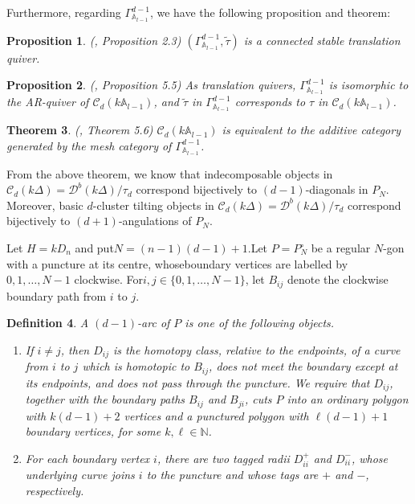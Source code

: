 \documentclass[12pt]{article}
\theoremstyle{plain}
\newtheorem{Def}{Definition}[section]
\newtheorem{Prop}[Def]{Proposition}
\newtheorem{Theo}[Def]{Theorem}
\theoremstyle{definition}
\begin{document}
Furthermore, regarding $\Gamma^{d-1}_{\mathbb{A}_{l-1}}$, we have the following proposition and theorem:

\begin{Prop}(\cite{BaurMarsh2008}, Proposition 2.3)
$(\Gamma^{d-1}_{\mathbb{A}_{l-1}}, \tilde{\tau})$ is a connected stable translation quiver.
\end{Prop}

\begin{Prop}(\cite{BaurMarsh2008}, Proposition 5.5)
As translation quivers, $\Gamma^{d-1}_{\mathbb{A}_{l-1}}$ is isomorphic to the AR-quiver of $\mathcal{C}_{d}(k\mathbb{A}_{l-1})$, and $\tilde{\tau}$ in $\Gamma^{d-1}_{\mathbb{A}_{l-1}}$ corresponds to $\tau$ in $\mathcal{C}_{d}(k\mathbb{A}_{l-1})$.
\end{Prop}

\begin{Theo}(\cite{BaurMarsh2008}, Theorem 5.6)
$\mathcal{C}_{d}(k\mathbb{A}_{l-1})$ is equivalent to the additive category generated by the mesh category of $\Gamma^{d-1}_{\mathbb{A}_{l-1}}$.
\end{Theo}

From the above theorem, we know that indecomposable objects in $\mathcal{C}_d(k\Delta) = \mathcal{D}^b(k\Delta)/\tau_{d}$ correspond bijectively to $(d-1)$-diagonals in $P_N$. Moreover, basic $d$-cluster tilting objects in $\mathcal{C}_d(k\Delta) = \mathcal{D}^b(k\Delta)/\tau_{d}$ correspond bijectively to $(d+1)$-angulations of $P_N$.

Let \(H=kD_n\) and put$N=(n-1)(d-1)+1$.Let \(P=P_N^\circ\) be a regular \(N\)-gon with a puncture at its centre, whoseboundary vertices are labelled by \(0,1,\ldots,N-1\) clockwise. For\(i,j\in\{0,1,\ldots,N-1\}\), let \(B_{ij}\) denote the clockwise boundary path
from \(i\) to \(j\).

\begin{Def}
A \((d-1)\)-arc of \(P\) is one of the following objects.
\begin{enumerate}
\item If \(i\neq j\), then \(D_{ij}\) is the homotopy class, relative to the
endpoints, of a curve from \(i\) to \(j\) which is homotopic to \(B_{ij}\),
does not meet the boundary except at its endpoints, and does not pass through
the puncture. We require that \(D_{ij}\), together with the boundary paths
\(B_{ij}\) and \(B_{ji}\), cuts \(P\) into an ordinary polygon with
\(k(d-1)+2\) vertices and a punctured polygon with \(\ell(d-1)+1\) boundary
vertices, for some \(k,\ell\in\mathbb N\).

\item For each boundary vertex \(i\), there are two tagged radii
\(D_{ii}^{+}\) and \(D_{ii}^{-}\), whose underlying curve joins \(i\) to the
puncture and whose tags are \(+\) and \(-\), respectively.
\end{enumerate}
\end{Def}
\end{document}
